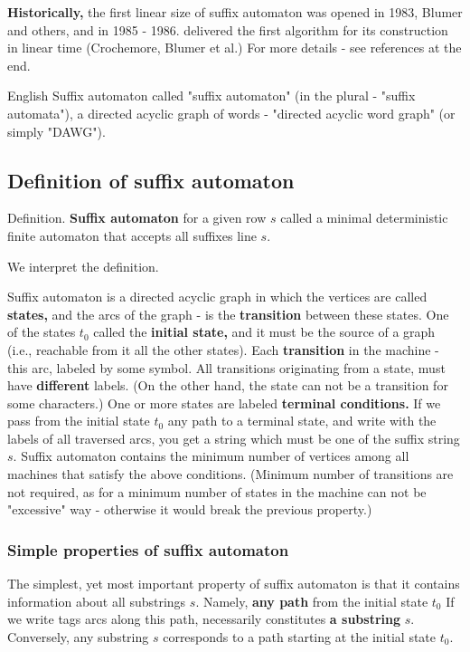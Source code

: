 \textbf{Historically,} the first linear size of suffix automaton was opened in 1983, Blumer and others, and in 1985 - 1986. delivered the first algorithm for its construction in linear time (Crochemore, Blumer et al.) For more details - see references at the end.

English Suffix automaton called "suffix automaton" (in the plural - "suffix automata"), a directed acyclic graph of words - "directed acyclic word graph" (or simply "DAWG").

\subsection{ Definition of suffix automaton }

Definition. \textbf{Suffix automaton} for a given row $s$ called a minimal deterministic finite automaton that accepts all suffixes line $s$.

We interpret the definition.

Suffix automaton is a directed acyclic graph in which the vertices are called \textbf{states,} and the arcs of the graph - is the \textbf{transition} between these states.
One of the states $t_0$ called the \textbf{initial state,} and it must be the source of a graph (i.e., reachable from it all the other states).
Each \textbf{transition} in the machine - this arc, labeled by some symbol. All transitions originating from a state, must have \textbf{different} labels. (On the other hand, the state can not be a transition for some characters.)
One or more states are labeled \textbf{terminal conditions.} If we pass from the initial state $t_0$ any path to a terminal state, and write with the labels of all traversed arcs, you get a string which must be one of the suffix string $s$.
Suffix automaton contains the minimum number of vertices among all machines that satisfy the above conditions. (Minimum number of transitions are not required, as for a minimum number of states in the machine can not be "excessive" way - otherwise it would break the previous property.)
\subsubsection{ Simple properties of suffix automaton }

The simplest, yet most important property of suffix automaton is that it contains information about all substrings $s$. Namely, \textbf{any path} from the initial state $t_0$ If we write tags arcs along this path, necessarily constitutes \textbf{a substring} $s$. Conversely, any substring $s$ corresponds to a path starting at the initial state $t_0$.

